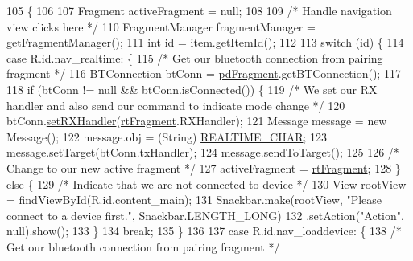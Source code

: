 \begin{DoxyCode}
105                                                            \{
106 
107         Fragment activeFragment = null;
108 
109         \textcolor{comment}{/* Handle navigation view clicks here */}
110         FragmentManager fragmentManager = getFragmentManager();
111         \textcolor{keywordtype}{int} \textcolor{keywordtype}{id} = item.getItemId();
112 
113         \textcolor{keywordflow}{switch} (\textcolor{keywordtype}{id}) \{
114             \textcolor{keywordflow}{case} R.id.nav\_realtime: \{
115                 \textcolor{comment}{/* Get our bluetooth connection from pairing fragment */}
116                 BTConnection btConn = \hyperlink{classcom_1_1jack_1_1motorbikestatistics_1_1_main_activity_a2802ad16b5fdba42834d1b31e255dd96}{pdFragment}.getBTConnection();
117 
118                 \textcolor{keywordflow}{if} (btConn != null && btConn.isConnected()) \{
119                     \textcolor{comment}{/* We set our RX handler and also send our command to indicate mode change */}
120                     btConn.\hyperlink{classcom_1_1jack_1_1motorbikestatistics_1_1_b_t_connection_aae8ee75e78f5beff98572bf3b13a60b8}{setRXHandler}(\hyperlink{classcom_1_1jack_1_1motorbikestatistics_1_1_main_activity_a5d506143e7f082edf2078025c00f3715}{rtFragment}.RXHandler);
121                     Message message = \textcolor{keyword}{new} Message();
122                     message.obj = (String) \hyperlink{classcom_1_1jack_1_1motorbikestatistics_1_1_main_activity_a6b63eb4aa15fd17f95f5d717e0e63108}{REALTIME\_CHAR};
123                     message.setTarget(btConn.txHandler);
124                     message.sendToTarget();
125 
126                     \textcolor{comment}{/* Change to our new active fragment */}
127                     activeFragment = \hyperlink{classcom_1_1jack_1_1motorbikestatistics_1_1_main_activity_a5d506143e7f082edf2078025c00f3715}{rtFragment};
128                 \} \textcolor{keywordflow}{else} \{
129                     \textcolor{comment}{/* Indicate that we are not connected to device */}
130                     View rootView = findViewById(R.id.content\_main);
131                     Snackbar.make(rootView, \textcolor{stringliteral}{"Please connect to a device first."}, Snackbar.LENGTH\_LONG)
132                             .setAction(\textcolor{stringliteral}{"Action"}, null).show();
133                 \}
134                 \textcolor{keywordflow}{break};
135             \}
136 
137             \textcolor{keywordflow}{case} R.id.nav\_loaddevice: \{
138                 \textcolor{comment}{/* Get our bluetooth connection from pairing fragment */}

\end{DoxyCode}
